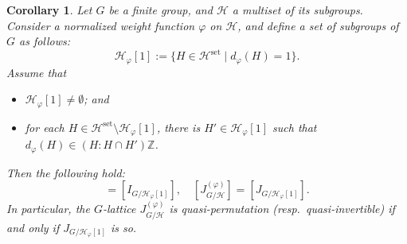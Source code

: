 \documentclass[12pt]{amsart}
\theoremstyle{plain}
\newtheorem{cor}[thm]{Corollary}
\theoremstyle{definition}
\numberwithin{thm}{section}
\numberwithin{equation}{section}
\newcommand{\Z}{\mathbb{Z}}
\newcommand{\cH}{\mathcal{H}}
\DeclareMathOperator{\set}{set}
\begin{document}
\begin{cor}\label{cor:rdmn}
Let $G$ be a finite group, and $\cH$ a multiset of its subgroups. Consider a normalized weight function $\varphi$ on $\cH$, and define a set of subgroups of $G$ as follows: 
\begin{equation*}
    \cH_{\varphi}[1]:=\{H\in \cH^{\set} \mid d_{\varphi}(H)=1\}. 
\end{equation*}
Assume that 
\begin{itemize}
    \item[(a)] $\cH_{\varphi}[1]\neq \emptyset$; and 
    \item[(b)] for each $H\in \cH^{\set}\setminus \cH_{\varphi}[1]$, there is $H'\in \cH_{\varphi}[1]$ such that $d_{\varphi}(H)\in (H:H\cap H')\Z$. 
\end{itemize}
Then the following hold: 
\begin{equation*}
[I_{G/\cH}^{(\varphi)}]=[I_{G/\cH_{\varphi}[1]}],\quad 
[J_{G/\cH}^{(\varphi)}]=[J_{G/\cH_{\varphi}[1]}]. 
\end{equation*}
In particular, the $G$-lattice $J_{G/\cH}^{(\varphi)}$ is quasi-permutation (resp.~quasi-invertible) if and only if $J_{G/\cH_{\varphi}[1]}$ is so. 
\end{cor}
\end{document}
